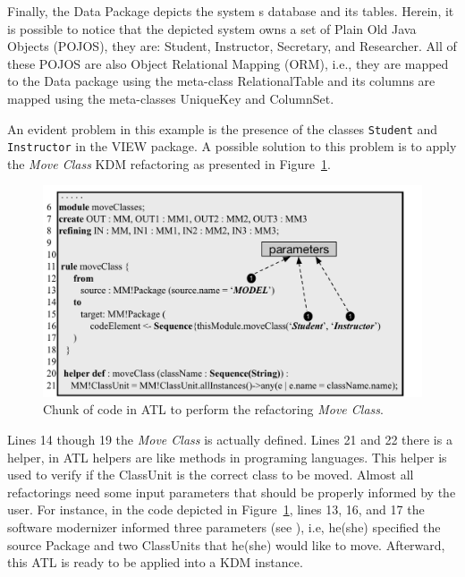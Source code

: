 Finally, the Data Package depicts the system s database and its tables. Herein, it is possible to notice that the depicted system owns a set of Plain Old Java Objects (POJOS), they are: Student, Instructor, Secretary, and Researcher. All of these POJOS are also Object Relational Mapping (ORM), i.e., they are mapped to the Data package using the meta-class RelationalTable and its columns are mapped using the meta-classes UniqueKey and ColumnSet.

An evident problem in this example is the presence of the classes \texttt{Student} and \texttt{Instructor} in the VIEW package. A possible solution to this problem is to apply the \textit{Move Class} KDM refactoring as presented in Figure~\ref{fig:ATLRefactoring}.

\begin{figure}[h]
	\centering
	\includegraphics[scale=0.516]{figuras/moveClassRefactoringFormatted}
	\caption{Chunk of code in ATL to perform the refactoring \textit{Move Class}.}
	\label{fig:ATLRefactoring}
\end{figure}

Lines 14 though 19 the \textit{Move Class} is actually defined. Lines 21 and 22 there is a helper, in ATL helpers are like methods in programing languages. This helper is used to verify if the ClassUnit is the correct class to be moved. 
Almost all refactorings need some input parameters that should be properly informed by the user. For instance, in the code depicted in Figure~\ref{fig:ATLRefactoring}, lines 13, 16, and 17 the software modernizer informed three parameters (see ), i.e, he(she) specified the source Package and two ClassUnits that he(she) would like to move.
Afterward, this ATL is ready to be applied into a KDM instance.

